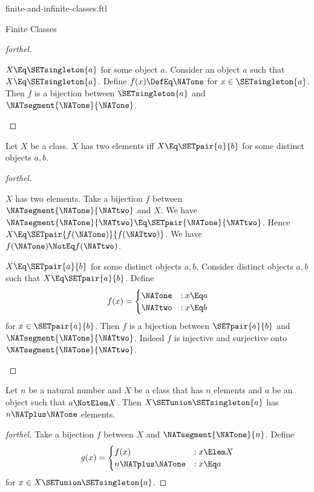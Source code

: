 \documentclass{stex}
\begin{document}
\begin{smodule}{finite-and-infinite-classes.ftl}
\begin{sfragment}{Finite Classes}
\begin{proof}[forthel]
    \begin{case}{$X \Eq \SETsingleton{a}$ for some object $a$.}
      Consider an object $a$ such that $X \Eq \SETsingleton{a}$.
      Define $f(x) \DefEq \NATone$ for $x \in \SETsingleton{a}$.
      Then $f$ is a bijection between $\SETsingleton{a}$ and $\NATsegment{\NATone}{\NATone}$.
    \end{case}
  \end{proof}

  \begin{proposition}[forthel]
    Let $X$ be a class.
    $X$ has two elements iff $X \Eq \SETpair{a}{b}$ for some distinct objects $a, b$.
  \end{proposition}
  \begin{proof}[forthel]
    \begin{case}{$X$ has two elements.}
      Take a bijection $f$ between $\NATsegment{\NATone}{\NATtwo}$ and $X$.
      We have $\NATsegment{\NATone}{\NATtwo} \Eq \SETpair{\NATone}{\NATtwo}$.
      Hence $X \Eq \SETpair{f(\NATone)}{f(\NATtwo)}$.
      We have $f(\NATone) \NotEq f(\NATtwo)$.
    \end{case}

    \begin{case}{$X \Eq \SETpair{a}{b}$ for some distinct objects $a, b$.}
      Consider distinct objects $a, b$ such that $X \Eq \SETpair{a}{b}$.
      Define \[f(x) =
        \begin{cases}
          \NATone & : x \Eq a \\
          \NATtwo & : x \Eq b
        \end{cases}\]
      for $x \in \SETpair{a}{b}$.
      Then $f$ is a bijection between $\SETpair{a}{b}$ and $\NATsegment{\NATone}{\NATtwo}$.
      Indeed $f$ is injective and surjective onto $\NATsegment{\NATone}{\NATtwo}$.
    \end{case}
  \end{proof}

  \begin{proposition}[forthel]
    Let $n$ be a natural number and $X$ be a class that has $n$ elements and $a$ be an object such that $a \NotElem X$.
    Then $X \SETunion \SETsingleton{a}$ has $n \NATplus \NATone$ elements.
  \end{proposition}
  \begin{proof}[forthel]
    Take a bijection $f$ between $X$ and $\NATsegment{\NATone}{n}$.
    Define \[g(x) =
      \begin{cases}
        f(x)  & : x \Elem X \\
        n \NATplus \NATone & : x \Eq a
      \end{cases}\]
    for $x \in X \SETunion \SETsingleton{a}$.


\end{proof}
\end{sfragment}
\end{smodule}
\end{document}
